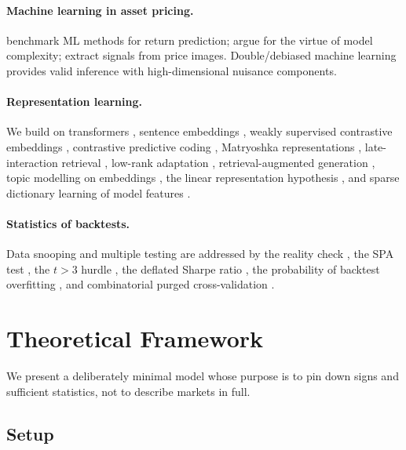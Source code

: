 \documentclass[11pt,a4paper]{article}
\theoremstyle{plain}
\theoremstyle{definition}
\theoremstyle{remark}
\begin{document}
\paragraph{Machine learning in asset pricing.} \citet{gu2020} benchmark ML methods for return prediction; \citet{kelly2024} argue for the virtue of model complexity; \citet{jiang2023} extract signals from price images. Double/debiased machine learning \citep{chernozhukov2018} provides valid inference with high-dimensional nuisance components.

\paragraph{Representation learning.} We build on transformers \citep{vaswani2017}, sentence embeddings \citep{reimers2019}, weakly supervised contrastive embeddings \citep{wang2022e5}, contrastive predictive coding \citep{oord2018}, Matryoshka representations \citep{kusupati2022}, late-interaction retrieval \citep{khattab2020}, low-rank adaptation \citep{hu2022}, retrieval-augmented generation \citep{lewis2020}, topic modelling on embeddings \citep{grootendorst2022}, the linear representation hypothesis \citep{park2023}, and sparse dictionary learning of model features \citep{cunningham2023,bricken2023}.

\paragraph{Statistics of backtests.} Data snooping and multiple testing are addressed by the reality check \citep{white2000}, the SPA test \citep{hansen2005}, the $t>3$ hurdle \citep{harvey2016}, the deflated Sharpe ratio \citep{bailey2014dsr}, the probability of backtest overfitting \citep{bailey2017pbo}, and combinatorial purged cross-validation \citep{lopezdeprado2018}.

\section{Theoretical Framework}\label{sec:theory}

We present a deliberately minimal model whose purpose is to pin down signs and sufficient statistics, not to describe markets in full.

\subsection{Setup}
\end{document}

